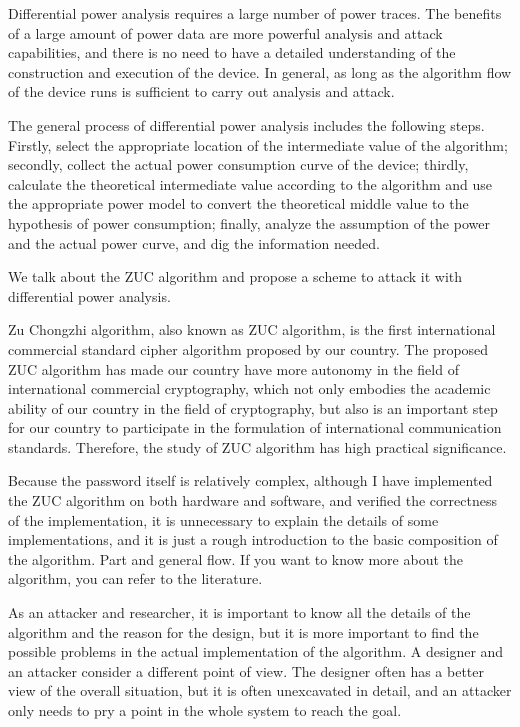 \begin{bigabstract}
Differential power analysis requires a large number of power traces. The benefits of a large amount of power data are more powerful analysis and attack capabilities, and there is no need to have a detailed understanding of the construction and execution of the device. In general, as long as the algorithm flow of the device runs is sufficient to carry out analysis and attack.

The general process of differential power analysis includes the following steps. Firstly, select the appropriate location of the intermediate value of the algorithm; secondly, collect the actual power consumption curve of the device; thirdly, calculate the theoretical intermediate value according to the algorithm and use the appropriate power model to convert the theoretical middle value to the hypothesis of power consumption; finally, analyze the assumption of the power and the actual power curve, and dig the information needed.


We talk about the ZUC algorithm and propose a scheme to attack it with differential power analysis.

Zu Chongzhi algorithm, also known as ZUC algorithm, is the first international commercial standard cipher algorithm proposed by our country. The proposed ZUC algorithm has made our country have more autonomy in the field of international commercial cryptography, which not only embodies the academic ability of our country in the field of cryptography, but also is an important step for our country to participate in the formulation of international communication standards. Therefore, the study of ZUC algorithm has high practical significance.

Because the password itself is relatively complex, although I have implemented the ZUC algorithm on both hardware and software, and verified the correctness of the implementation, it is unnecessary to explain the details of some implementations, and it is just a rough introduction to the basic composition of the algorithm. Part and general flow. If you want to know more about the algorithm, you can refer to the literature.

As an attacker and researcher, it is important to know all the details of the algorithm and the reason for the design, but it is more important to find the possible problems in the actual implementation of the algorithm. A designer and an attacker consider a different point of view. The designer often has a better view of the overall situation, but it is often unexcavated in detail, and an attacker only needs to pry a point in the whole system to reach the goal.


\end{bigabstract}
